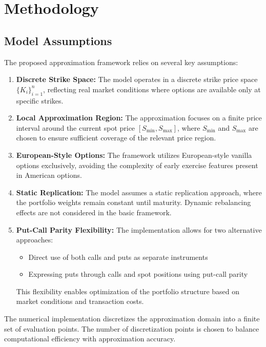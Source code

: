 \documentclass[12pt]{article}
\begin{document}
\section{Methodology}
\subsection{Model Assumptions}
The proposed approximation framework relies on several key assumptions:

\begin{enumerate}
    \item \textbf{Discrete Strike Space:} The model operates in a discrete strike price space 
    $\{K_i\}_{i=1}^n$, reflecting real market conditions where options are available only 
    at specific strikes.
    
    \item \textbf{Local Approximation Region:} The approximation focuses on a finite price 
    interval around the current spot price $[S_{\min}, S_{\max}]$, where $S_{\min}$ and $S_{\max}$ 
    are chosen to ensure sufficient coverage of the relevant price region.
    
    \item \textbf{European-Style Options:} The framework utilizes European-style vanilla 
    options exclusively, avoiding the complexity of early exercise features present in 
    American options.
    
    \item \textbf{Static Replication:} The model assumes a static replication approach, 
    where the portfolio weights remain constant until maturity. Dynamic rebalancing effects 
    are not considered in the basic framework.
    
    \item \textbf{Put-Call Parity Flexibility:} The implementation allows for two 
    alternative approaches:
    \begin{itemize}
        \item Direct use of both calls and puts as separate instruments
        \item Expressing puts through calls and spot positions using put-call parity
    \end{itemize}
    This flexibility enables optimization of the portfolio structure based on market 
    conditions and transaction costs.
\end{enumerate}

The numerical implementation discretizes the approximation domain into a finite set of 
evaluation points. The number of discretization points is chosen to balance computational 
efficiency with approximation accuracy.
\end{document}
